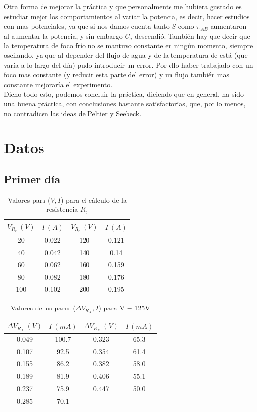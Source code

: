 \documentclass[12pt,a4paper]{article}
\begin{document}
Otra forma de mejorar la práctica y que personalmente me hubiera gustado es estudiar mejor los comportamientos al variar la potencia, es decir, hacer estudios con mas potenciales, ya que  si nos damos cuenta tanto $S$ como $\pi_{AB}$ aumentaron al aumentar la potencia, y sin embargo $C_a$ descendió. También hay que decir que la temperatura de foco frío no se mantuvo constante en ningún momento, siempre oscilando, ya que al depender del flujo de agua y de la temperatura de está (que varía a lo largo del día) pudo introducir un error. Por ello haber trabajado con un foco mas constante (y reducir esta parte del error) y un flujo también mas constante mejoraría el experimento. \\

Dicho todo esto, podemos concluir la práctica, diciendo que en general, ha sido una buena práctica, con conclusiones bastante satisfactorias, que, por lo menos, no contradicen las ideas de Peltier y Seebeck.


\newpage

\newpage

\section{Datos}
\subsection{Primer día}

\begin{table}[h!] 	 \centering 
\begin{tabular}{|c|c||c|c|} 
\hline 
$ V_{R_c} \ (V)$ & $I \ (A) $ & $ V_{R_c} \ (V)$ & $I \ (A) $  \\ \hline 
20 &  0.022 & 120 & 0.121 \\ 
40  &  0.042 & 140 & 0.14 \\ 
60 &  0.062 & 160 & 0.159 \\ 
80 &  0.082 & 180 & 0.176 \\ 
100 &  0.102 & 200 & 0.195 \\ 
\hline 
\end{tabular} 
\caption{Valores para ($V,I$) para el cálculo de la  resistencia $R_c$} 
\label{tab:} 
\end{table} 



\begin{table}[h!] 	 \centering 
\begin{tabular}{|c|c||c|c|} 
\hline 
$\Delta V_{R_X} \ (V)$ & $I \ (mA) $ & $\Delta V_{R_X} \ (V)$ & $I \ (mA) $  \\ \hline 
0.049 &  100.7 & 0.323 & 65.3 \\ 
0.107 &  92.5 & 0.354 & 61.4 \\ 
0.155 &  86.2 & 0.382 & 58.0 \\ 
0.189 &  81.9 & 0.406 & 55.1 \\ 
0.237 &  75.9 & 0.447 & 50.0 \\ 
0.285 &  70.1 & - & - \\ 
\hline 
\end{tabular} 
\caption{Valores de los pares ($\Delta V_{R_X},I$) para V = 125V} 
\label{tab:} 
\end{table} 
\end{document}
